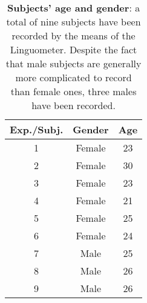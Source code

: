\begin{table}[ht!]
  \begin{center}
  \begin{scriptsize}
	\begin{tabular}{|c|c|c|}
	  \hline
	  \textbf{Exp./Subj.} & \textbf{Gender} & \textbf{Age}\\
	  \hline
	  1 & Female & 23\\
	  2 & Female & 30\\
	  3 & Female & 23\\
	  4 & Female & 21\\
	  5 & Female & 25\\
	  6 & Female & 24\\
	  7 & Male & 25\\
	  8 & Male & 26\\
	  9 & Male & 26\\
	  \hline
  \end{tabular}
  \end{scriptsize}
  \end{center}
	\caption[Subjects' age and gender]{\textbf{Subjects' age and gender}: 
	a total of nine subjects have been recorded by the means of the Linguometer.
	Despite the fact that male subjects are generally more complicated to record
	than female ones, three males have been recorded.}
 \label{tab:experiments:subjects}
\end{table}
